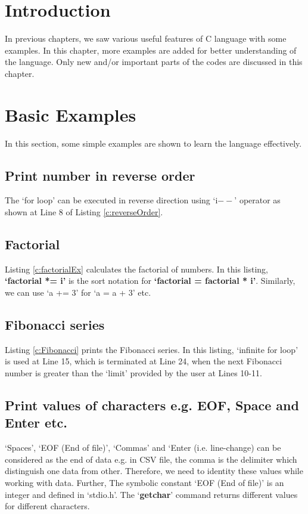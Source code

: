 \section{Introduction}
In previous chapters, we saw various useful features of C language with some examples. In this chapter, more examples are added for better understanding of the language. Only new and/or important parts of the codes are discussed in this chapter. 

\section{Basic Examples}
In this section, some simple examples are shown to learn the language effectively.

\subsection{Print number in reverse order}
The `for loop' can be executed in reverse direction using `i$--$' operator as shown at Line 8 of Listing \ref{c:reverseOrder}. 


\subsection{Factorial}
Listing \ref{c:factorialEx} calculates the factorial of numbers. In this listing, \textbf{`factorial *= i'} is the sort notation for \textbf{`factorial = factorial * i'}. Similarly, we can use `a += 3' for `a = a + 3' etc. 



\subsection{Fibonacci series}
Listing \ref{c:Fibonacci} prints the Fibonacci series. In this listing, `infinite for loop' is used at Line 15, which is terminated at Line 24, when the next Fibonacci number is greater than the `limit'  provided by the user at Lines 10-11.  



\subsection{Print values of characters e.g. EOF, Space and Enter etc.} \label{value_EOF_ENTER}
`Spaces', `EOF (End of file)', `Commas' and `Enter (i.e. line-change) can be considered as the end of data e.g. in CSV file, the comma is the delimiter which distinguish one data from other. Therefore, we need to identity these values while working with data. Further, The symbolic constant `EOF (End of file)' is an integer and defined in `stdio.h'. The `\textbf{getchar}' command returns different values for different characters. 

